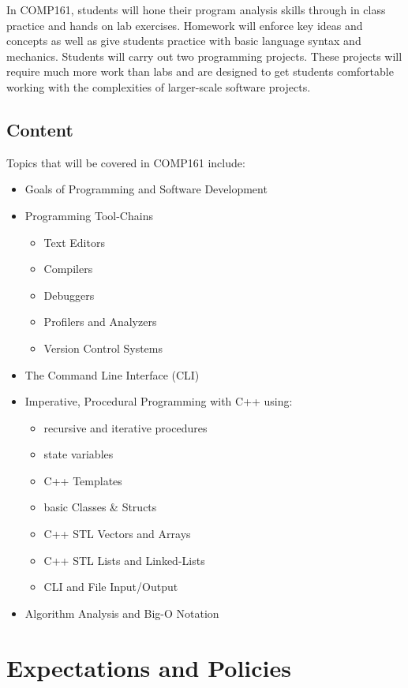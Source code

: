 \documentclass[10pt]{article}
\begin{document}
In COMP161, students will hone their program analysis skills through in class practice and hands on lab exercises.  Homework will enforce key ideas and concepts as well as give students practice with basic language syntax and mechanics.  Students will carry out two programming projects.  These projects will require much more work than labs and are designed to get students comfortable working with the complexities of larger-scale software projects.

\subsection{Content}

Topics that will be covered in COMP161 include:
\begin{itemize}
\item Goals of Programming and Software Development
\item Programming Tool-Chains
\begin{itemize}
\item Text Editors
\item Compilers
\item Debuggers
\item Profilers and Analyzers
\item Version Control Systems
\end{itemize}
\item The Command Line Interface (CLI) 
\item Imperative, Procedural Programming with C++ using:
\begin{itemize}
\item recursive and iterative procedures
\item state variables
\item C++ Templates
\item basic Classes \& Structs
\item C++ STL Vectors and Arrays
\item C++ STL Lists and Linked-Lists
\item CLI and File Input/Output
\end{itemize}
\item Algorithm Analysis and Big-O Notation
\end{itemize}  


\section{Expectations and Policies}
\end{document}
